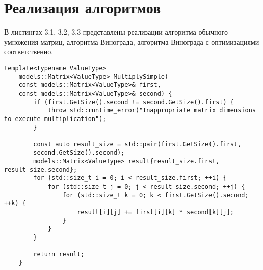 \section{Реализация алгоритмов}

В листингах 3.1, 3.2, 3.3 представлены реализации алгоритма обычного умножения матриц, алгоритма Винограда, алгоритма Винограда с оптимизациями соответственно.

\begin{lstlisting}[caption=Функция стандартного умножения матриц]
	template<typename ValueType>
	models::Matrix<ValueType> MultiplySimple(
	const models::Matrix<ValueType>& first,
	const models::Matrix<ValueType>& second) {
		if (first.GetSize().second != second.GetSize().first) {
			throw std::runtime_error("Inappropriate matrix dimensions to execute multiplication");
		}
		
		const auto result_size = std::pair(first.GetSize().first,
		second.GetSize().second);
		models::Matrix<ValueType> result{result_size.first, result_size.second};
		for (std::size_t i = 0; i < result_size.first; ++i) {
			for (std::size_t j = 0; j < result_size.second; ++j) {
				for (std::size_t k = 0; k < first.GetSize().second; ++k) {
					result[i][j] += first[i][k] * second[k][j];
				}
			}
		}
		
		return result;
	}
\end{lstlisting}


